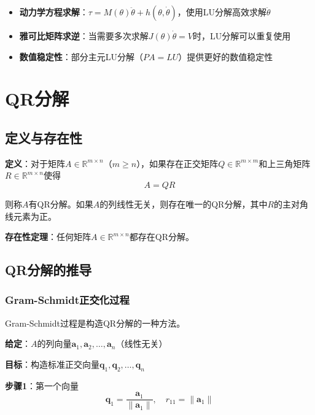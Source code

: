 \documentclass[12pt,a4paper]{article}
\begin{document}
\begin{itemize}
\item \textbf{动力学方程求解}：$\tau = M(\theta) \ddot{\theta} + h(\theta, \dot{\theta})$，使用LU分解高效求解$\ddot{\theta}$
\item \textbf{雅可比矩阵求逆}：当需要多次求解$J(\theta) \dot{\theta} = V$时，LU分解可以重复使用
\item \textbf{数值稳定性}：部分主元LU分解（$PA = LU$）提供更好的数值稳定性
\end{itemize}

\section{QR分解}

\subsection{定义与存在性}

\textbf{定义}：对于矩阵$A \in \mathbb{R}^{m \times n}$（$m \geq n$），如果存在正交矩阵$Q \in \mathbb{R}^{m \times m}$和上三角矩阵$R \in \mathbb{R}^{m \times n}$使得
\begin{equation}
A = QR
\label{eq:qr_decomp}
\end{equation}

则称$A$有QR分解。如果$A$的列线性无关，则存在唯一的QR分解，其中$R$的主对角线元素为正。

\textbf{存在性定理}：任何矩阵$A \in \mathbb{R}^{m \times n}$都存在QR分解。

\subsection{QR分解的推导}

\subsubsection{Gram-Schmidt正交化过程}

Gram-Schmidt过程是构造QR分解的一种方法。

\textbf{给定}：$A$的列向量$\bm{a}_1, \bm{a}_2, \ldots, \bm{a}_n$（线性无关）

\textbf{目标}：构造标准正交向量$\bm{q}_1, \bm{q}_2, \ldots, \bm{q}_n$

\textbf{步骤1}：第一个向量
\begin{equation}
\bm{q}_1 = \frac{\bm{a}_1}{\|\bm{a}_1\|}, \quad r_{11} = \|\bm{a}_1\|
\end{equation}
\end{document}
